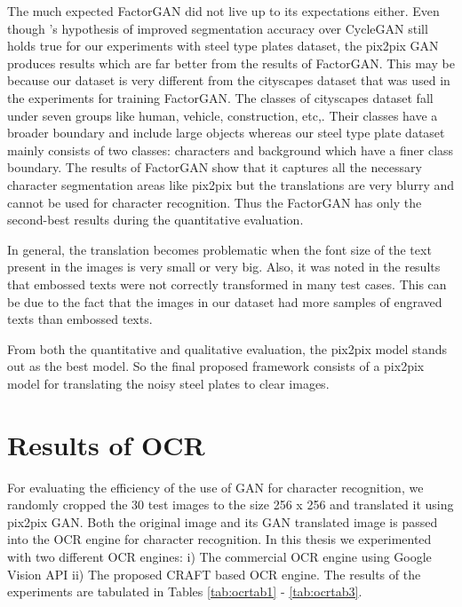The much expected FactorGAN did not live up to its expectations either. Even though \citeauthor{stoller2019training}'s hypothesis of improved segmentation accuracy over CycleGAN still holds true for our experiments with steel type plates dataset, the pix2pix GAN produces results which are far better from the results of FactorGAN. This may be because our dataset is very different from the cityscapes dataset \citep{cordts2016cityscapes} that was used in the \citeauthor{stoller2019training} experiments for training FactorGAN. The classes of cityscapes dataset fall under seven groups like human, vehicle, construction, etc,. Their classes have a broader boundary and include large objects whereas our steel type plate dataset mainly consists of two classes: characters and background which have a finer class boundary. The results of FactorGAN show that it captures all the necessary character segmentation areas like pix2pix but the translations are very blurry and cannot be used for character recognition. Thus the FactorGAN has only the second-best results during the quantitative evaluation. 
\newline

	In general, the translation becomes problematic when the font size of the text present in the images is very small or very big. Also, it was noted in the results that embossed texts were not correctly transformed in many test cases. This can be due to the fact that the images in our dataset had more samples of engraved texts than embossed texts. 
\newline
	
	From both the quantitative and qualitative evaluation, the pix2pix model stands out as the best model. So the final proposed framework consists of a pix2pix model for translating the noisy steel plates to clear images. 
	
\section{Results of OCR}
For evaluating the efficiency of the use of GAN for character recognition, we randomly cropped the 30 test images to the size 256 x 256 and translated it using pix2pix GAN. Both the original image and its GAN translated image is passed into the OCR engine for character recognition. In this thesis we experimented with two different OCR engines: i) The commercial OCR engine using Google Vision API ii) The proposed CRAFT based OCR engine. The results of the experiments are tabulated in Tables \ref{tab:ocrtab1} - \ref{tab:ocrtab3}.				


